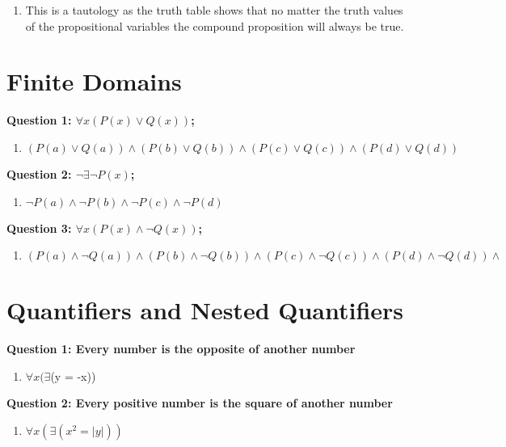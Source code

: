 \documentclass[11pt]{article}
\begin{document}
\begin{enumerate}
\begin{enumerate}[label=(\alph*)]
\begin{center}
\begin{tabular}{ |c|c|c|c|c|c|c|c|c| }
 \hline

\end{tabular}
\end{center}
\item 
This is a tautology as the truth table shows that no matter the truth values of the propositional variables the compound proposition will always be true.

\end{enumerate}

\section{\textbf{Finite Domains}}
\textbf{Question 1: $\forall x(P(x) \lor Q(x)) $;}
\begin{enumerate}[label=(\alph*)]
\item
$(P(a) \lor Q(a)) \land (P(b) \lor Q(b)) \land (P(c) \lor Q(c)) \land (P(d) \lor Q(d))$

\end{enumerate}

\textbf{Question 2: $\neg \exists \neg P(x)$;}
\begin{enumerate}[label=(\alph*)]
\item
$\neg P(a) \land \neg P(b) \land \neg P(c) \land \neg P(d)$

\end{enumerate}

\textbf{Question 3: $\forall x(P(x) \land \neg Q(x)) $;}
\begin{enumerate}[label=(\alph*)]
\item
$(P(a) \land \neg Q(a)) \land (P(b) \land \neg Q(b)) \land (P(c) \land \neg Q(c)) \land (P(d) \land \neg Q(d)) \land$

\end{enumerate}

\section{\textbf{Quantifiers and Nested Quantifiers}}
\textbf{Question 1: Every number is the opposite of another number}
\begin{enumerate}[label=(\alph*)]
\item
$\forall x(\exists$(y = -x))

\end{enumerate}

\textbf{Question 2: Every positive number is the square of another number}
\begin{enumerate}[label=(\alph*)]
\item
$\forall x(\exists (x^2 = |y|))$


\end{enumerate}
\end{enumerate}
\end{document}
